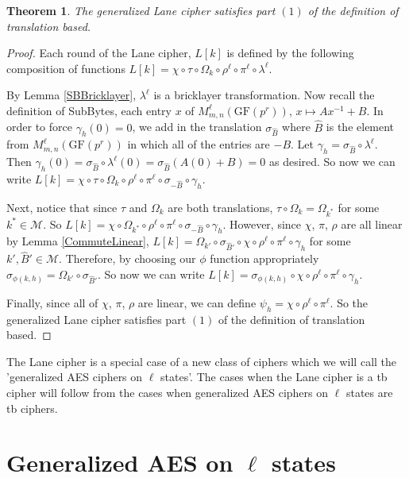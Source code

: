 \documentclass[11pt]{amsart}
\newcommand{\MM}{\mathcal{M}}
\newcommand{\GF}{\mathrm{GF}}
\newtheorem{theorem}{{\bf Theorem }}
\begin{document}
\begin{theorem}
The generalized Lane cipher satisfies part $(1)$ of the definition of translation based.
\end{theorem}
\begin{proof}
Each round of the Lane cipher, $L[k]$ is defined by the following composition of functions $L[k]=\chi \circ \tau \circ \Omega_k \circ \rho^\ell \circ \pi^\ell \circ \lambda^\ell$.

By Lemma \ref{SBBricklayer}, $\lambda^\ell$ is a bricklayer transformation. Now recall the definition of SubBytes, each entry $x$ of $M^\ell_{m,n}(\GF(p^r))$, $x \mapsto Ax^{-1} + B$. In order to force $\gamma_h (0)=0$, we add in the translation $\sigma_{\hat{B}}$ where $\hat{B}$ is the element from $M^\ell_{m,n}(\GF(p^r))$ in which all of the entries are $-B$. Let $\gamma_h = \sigma_{\hat{B}} \circ \lambda^\ell$. Then $\gamma_h (0) = \sigma_{\hat{B}} \circ \lambda^\ell (0) = \sigma_{\hat{B}} (A(0)+B) = 0$ as desired. So now we can write $L[k]=\chi \circ \tau \circ \Omega_k \circ \rho^\ell \circ \pi^\ell \circ \sigma_{-\hat{B}} \circ \gamma_h$.

Next, notice that since $\tau$ and $\Omega_k$ are both translations, $\tau \circ \Omega_k = \Omega_{k^*}$ for some $k^* \in \MM$. So $L[k]=\chi \circ \Omega_{k^*} \circ \rho^\ell \circ \pi^\ell \circ \sigma_{-\hat{B}} \circ \gamma_h$. However, since $\chi$, $\pi$, $\rho$ are all linear by Lemma \ref{CommuteLinear}, $L[k]=  \Omega_{k'} \circ \sigma_{\hat{B}'} \circ \chi \circ \rho^\ell \circ \pi^\ell \circ  \gamma_h$ for some $k', \hat{B}' \in \MM$. Therefore, by choosing our $\phi$ function appropriately $\sigma_{\phi(k,h)} = \Omega_{k'} \circ \sigma_{\hat{B}'}$. So now we can write $L[k]= \sigma_{\phi(k,h)} \circ \chi \circ \rho^\ell \circ \pi^\ell \circ \gamma_h$.

Finally, since all of $\chi$, $\pi$, $\rho$ are linear, we can define $\psi_h = \chi \circ \rho^\ell \circ \pi^\ell$. So the generalized Lane cipher satisfies part $(1)$ of the definition of translation based.
\end{proof}

The Lane cipher is a special case of a new class of ciphers which we will call the 'generalized AES ciphers on $\ell$ states'. The cases when the Lane cipher is a tb cipher will follow from the cases when generalized AES ciphers on $\ell$ states are tb ciphers.

\section{Generalized AES on $\ell$ states}
\end{document}
